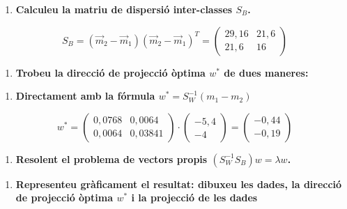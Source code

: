 \documentclass[a4paper]{article}
\begin{document}
\begin{enumerate}[resume=main]
	\item \textbf{Calculeu la matriu de dispersió inter-classes $S_B$.}
\end{enumerate}
$$
S_B = (\vec{m}_2 - \vec{m}_1)(\vec{m}_2 - \vec{m}_1)^T = 
\begin{pmatrix}
29,16 & 21,6 \\
21,6 & 16
\end{pmatrix}
$$

\begin{enumerate}[resume=main]
	\item \textbf{Trobeu la direcció de projecció òptima $w^*$ de dues maneres:}
\end{enumerate}

\begin{enumerate}[resume=second,label=(\alph*),itemindent=1em]
	\item \textbf{Directament amb la fórmula $w^* = S_W^{-1} (m_1 - m_2)$}
\end{enumerate}

$$
w^* = 
\begin{pmatrix}
0,0768 & 0,0064 \\
0,0064 & 0,03841
\end{pmatrix} ·
\begin{pmatrix}
-5,4 \\ -4
\end{pmatrix} =
\begin{pmatrix}
-0,44 \\
-0,19
\end{pmatrix}
$$

\begin{enumerate}[resume=second,label=(\alph*),itemindent=1em]
	\item \textbf{Resolent el problema de vectors propis $(S_W^{-1}S_B)w = \lambda w$.}
\end{enumerate}

\begin{enumerate}[resume=main]
	\item \textbf{Representeu gràficament el resultat: dibuxeu les dades, la direcció de projecció òptima $w^*$ i la projecció de les dades}
\end{enumerate}
\end{document}
